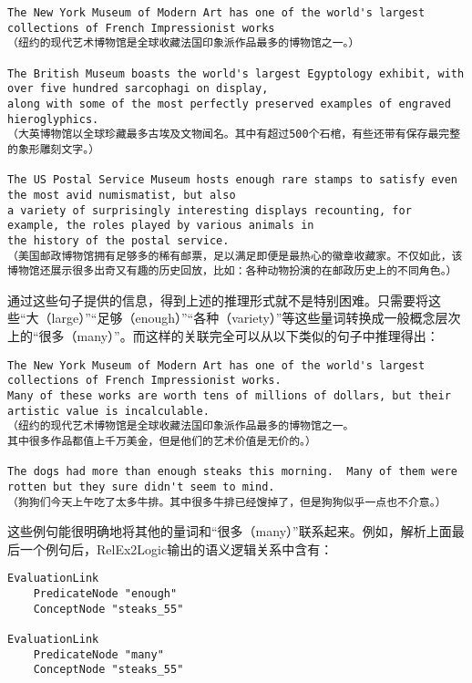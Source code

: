 \begin{verbatim}
The New York Museum of Modern Art has one of the world's largest collections of French Impressionist works
（纽约的现代艺术博物馆是全球收藏法国印象派作品最多的博物馆之一。）

The British Museum boasts the world's largest Egyptology exhibit, with over five hundred sarcophagi on display,
along with some of the most perfectly preserved examples of engraved hieroglyphics.
（大英博物馆以全球珍藏最多古埃及文物闻名。其中有超过500个石棺，有些还带有保存最完整的象形雕刻文字。）

The US Postal Service Museum hosts enough rare stamps to satisfy even the most avid numismatist, but also
a variety of surprisingly interesting displays recounting, for example, the roles played by various animals in
the history of the postal service.
（美国邮政博物馆拥有足够多的稀有邮票，足以满足即便是最热心的徽章收藏家。不仅如此，该博物馆还展示很多出奇又有趣的历史回放，比如：各种动物扮演的在邮政历史上的不同角色。）

\end{verbatim}

\noindent 通过这些句子提供的信息，得到上述的推理形式就不是特别困难。只需要将这些“大（large）”“足够（enough）”“各种（variety）”等这些量词转换成一般概念层次上的“很多（many）”。而这样的关联完全可以从以下类似的句子中推理得出：

\begin{verbatim}
The New York Museum of Modern Art has one of the world's largest collections of French Impressionist works.
Many of these works are worth tens of millions of dollars, but their artistic value is incalculable.
（纽约的现代艺术博物馆是全球收藏法国印象派作品最多的博物馆之一。
其中很多作品都值上千万美金，但是他们的艺术价值是无价的。）

The dogs had more than enough steaks this morning.  Many of them were rotten but they sure didn't seem to mind.
（狗狗们今天上午吃了太多牛排。其中很多牛排已经馊掉了，但是狗狗似乎一点也不介意。）
\end{verbatim}

\noindent 这些例句能很明确地将其他的量词和“很多（many）”联系起来。例如，解析上面最后一个例句后，RelEx2Logic输出的语义逻辑关系中含有：


 {\tt\begin{small}\begin{lstlisting}
EvaluationLink
	PredicateNode "enough"
	ConceptNode "steaks_55"
	
EvaluationLink
	PredicateNode "many"
	ConceptNode "steaks_55"
\end{lstlisting}\end{small}}

